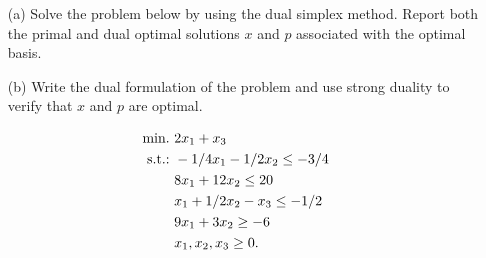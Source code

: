 \begin{itemize}
\item[(a)] Solve the problem below by using the dual simplex method. Report both the primal and dual optimal solutions $x$ and $p$ associated with the optimal basis.
\item[(b)] Write the dual formulation of the problem and use strong duality to verify that $x$ and $p$ are optimal.
\end{itemize}
%
\begin{align*}
	\mathop{\text{min.~}} & 2x_1 + x_3  \\
	\mathop{\text{s.t.:~}} & -1/4 x_1 - 1/2 x_2 \leq -3/4 \\
	& 8x_1 + 12 x_2 \leq 20 \\
	& x_1 + 1/2 x_2 - x_3 \leq -1/2 \\
	& 9x_1 + 3 x_2 \geq -6 \\
	& x_1, x_2, x_3 \geq 0.
\end{align*}
